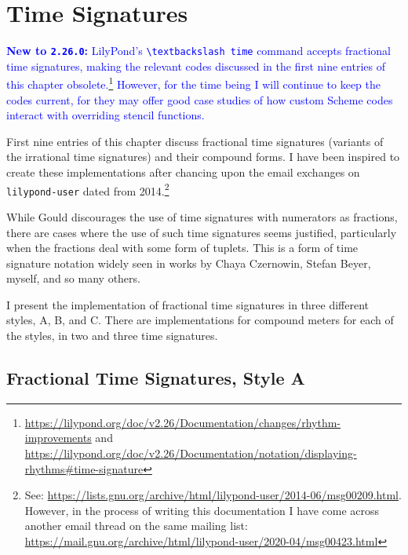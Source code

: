 

\chapter {Time Signatures}

\textcolor{blue}{\textbf{New to \Verb|2.26.0|: }LilyPond's \Verb|\textbackslash time| command accepts fractional time signatures, making the relevant codes discussed in the first nine entries of this chapter obsolete.\footnote{\url{https://lilypond.org/doc/v2.26/Documentation/changes/rhythm-improvements} and \url{https://lilypond.org/doc/v2.26/Documentation/notation/displaying-rhythms\#time-signature}} However, for the time being I will continue to keep the codes current, for they may offer good case studies of how custom Scheme codes interact with overriding stencil functions.}

First nine entries of this chapter discuss fractional time signatures (variants of the irrational time signatures) and their compound forms. I have been inspired to create these implementations after chancing upon the email exchanges on \verb|lilypond-user| dated from 2014.\footnote{See: \url{https://lists.gnu.org/archive/html/lilypond-user/2014-06/msg00209.html}. However, in the process of writing this documentation I have come across another email thread on the same mailing list: \url{https://mail.gnu.org/archive/html/lilypond-user/2020-04/msg00423.html} }

While Gould discourages the use of time signatures with numerators as fractions,\autocite[180]{RN1741} there are cases where the use of such time signatures seems justified, particularly when the fractions deal with some form of tuplets. This is a form of time signature notation widely seen in works by Chaya Czernowin, Stefan Beyer, myself, and so many others.

I present the implementation of fractional time signatures in three different styles, A, B, and C. There are implementations for compound meters for each of the styles, in two and three time signatures. 

\newpage

\section {Fractional Time Signatures, Style A}
\label{sec:time_signatures}
\hfill
{}
\hfill

